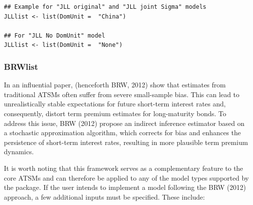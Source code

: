\begin{verbatim}
## Example for "JLL original" and "JLL joint Sigma" models
JLLlist <- list(DomUnit =  "China")

## For "JLL No DomUnit" model
JLLlist <- list(DomUnit =  "None")
\end{verbatim}

\subsubsection{BRWlist}\label{S:SectionBRWinputs}

In an influential paper, \citet{BauerRudebuschWu2012} (henceforth BRW, 2012) show that estimates from traditional ATSMs often suffer from severe small-sample bias. This can lead to unrealistically stable expectations for future short-term interest rates and, consequently, distort term premium estimates for long-maturity bonds. To address this issue, BRW (2012) propose an indirect inference estimator based on a stochastic approximation algorithm, which corrects for bias and enhances the persistence of short-term interest rates, resulting in more plausible term premium dynamics.

It is worth noting that this framework serves as a complementary feature to the core ATSMs and can therefore be applied to any of the model types supported by the  package. If the user intends to implement a model following the BRW (2012) approach, a few additional inputs must be specified. These include:

